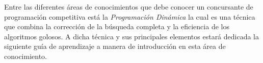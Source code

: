 Entre las diferentes áreas de conocimientos que debe conocer un concursante de programación competitiva está la \emph{Programación Dinámica} la cual es una técnica que combina la corrección de la búsqueda completa y la eficiencia de los algoritmos golosos. A dicha técnica y sus principales elementos estará dedicada la siguiente guía de aprendizaje a manera de introducción en esta área de conocimiento.    